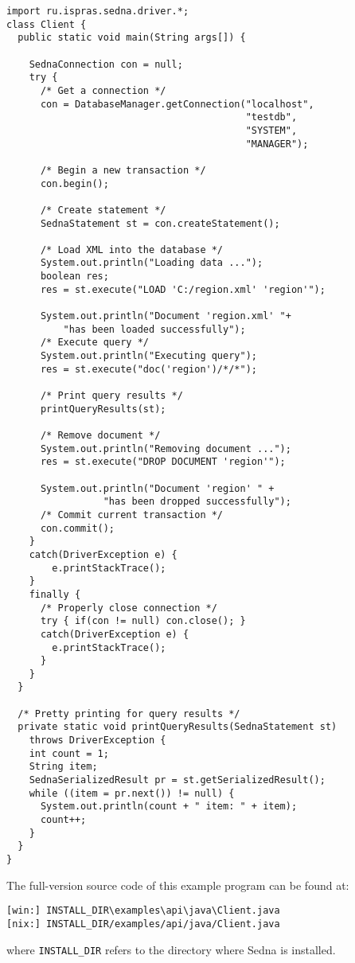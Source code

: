 \documentclass[a4paper,12pt]{article}
\begin{document}
\small{
\begin{verbatim}
import ru.ispras.sedna.driver.*;
class Client {
  public static void main(String args[]) {

    SednaConnection con = null;
    try {
      /* Get a connection */
      con = DatabaseManager.getConnection("localhost",
                                          "testdb", 
                                          "SYSTEM",
                                          "MANAGER");

      /* Begin a new transaction */
      con.begin();

      /* Create statement */
      SednaStatement st = con.createStatement();

      /* Load XML into the database */
      System.out.println("Loading data ...");
      boolean res; 
      res = st.execute("LOAD 'C:/region.xml' 'region'");

      System.out.println("Document 'region.xml' "+ 
          "has been loaded successfully");
      /* Execute query */
      System.out.println("Executing query");
      res = st.execute("doc('region')/*/*");

      /* Print query results */
      printQueryResults(st);

      /* Remove document */
      System.out.println("Removing document ...");
      res = st.execute("DROP DOCUMENT 'region'");

      System.out.println("Document 'region' " + 
                 "has been dropped successfully");
      /* Commit current transaction */
      con.commit();
    }
    catch(DriverException e) {
        e.printStackTrace();
    }
    finally {
      /* Properly close connection */
      try { if(con != null) con.close(); }
      catch(DriverException e) {
        e.printStackTrace();
      }
    }
  }

  /* Pretty printing for query results */
  private static void printQueryResults(SednaStatement st)
    throws DriverException {
    int count = 1;
    String item;
    SednaSerializedResult pr = st.getSerializedResult();
    while ((item = pr.next()) != null) {
      System.out.println(count + " item: " + item);
      count++;
    }
  }
}
\end{verbatim}}

The full-version source code of this example program can be found at:
\begin{verbatim}
[win:] INSTALL_DIR\examples\api\java\Client.java
[nix:] INSTALL_DIR/examples/api/java/Client.java
\end{verbatim}
where \verb!INSTALL_DIR! refers to the directory where Sedna is installed.
\end{document}
